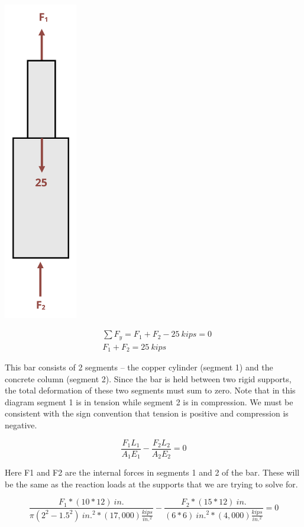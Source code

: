 \documentclass[
  letterpaper,
  DIV=11,
  numbers=noendperiod]{scrreprt}
\begin{document}
\begin{tcolorbox}
\begin{tcolorbox}
\begin{center}
\includegraphics[width=1.26042in,height=\textheight]{images/PNGs/Example 5.6 part 2.png}
\end{center}

\[
\begin{aligned}
& \sum F_y=F_1+F_2-25{~kips}=0 \\
& F_1+F_2=25{~kips}
\end{aligned}
\]

This bar consists of 2 segments -- the copper cylinder (segment 1) and
the concrete column (segment 2). Since the bar is held between two rigid
supports, the total deformation of these two segments must sum to zero.
Note that in this diagram segment 1 is in tension while segment 2 is in
compression. We must be consistent with the sign convention that tension
is positive and compression is negative.

\[
\frac{F_1 L_1}{A_1 E_1}-\frac{F_2 L_2}{A_2 E_2}=0
\]

Here F1 and F2 are the internal forces in segments 1 and 2 of the bar.
These will be the same as the reaction loads at the supports that we are
trying to solve for.

\[
\frac{F_1 *(10 * 12){~in.}}{\pi(2^2-1.5^2){~in.}^2 *(17,000)\frac{kips}{in.^2}}-\frac{F_2 *(15 * 12){~in.}}{(6 * 6){~in.}^2 *(4,000)\frac{kips}{in.^2}}=0
\]


\end{tcolorbox}
\end{tcolorbox}
\end{document}
